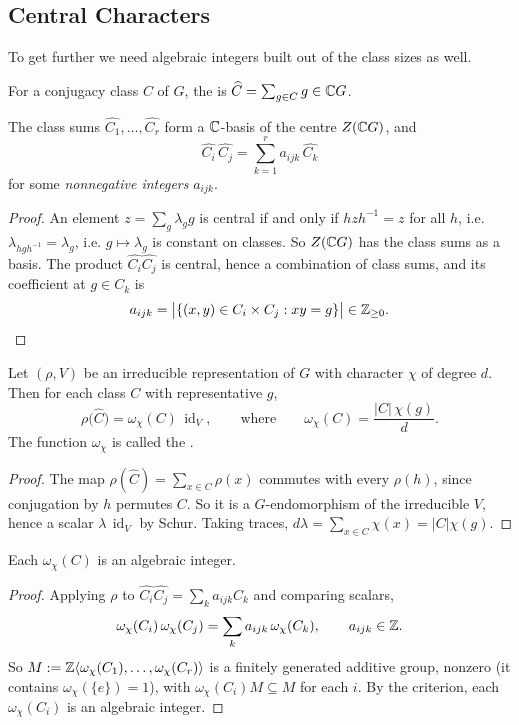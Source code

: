 \documentclass[a4paper]{scrartcl}
\newcommand{\id}{\operatorname{id}}
\newcommand{\gen}[1]{\langle #1 \rangle}
\begin{document}
\subsection{Central Characters}

To get further we need algebraic integers built out of the class sizes as well.

\begin{definition}
	For a conjugacy class $C$ of $G$, the  is $\widehat C = \sum_{g\in C}g \in \mathbb{C} G$.
\end{definition}

\begin{proposition}
	The class sums $\widehat{C_1},\dots,\widehat{C_r}$ form a $\mathbb{C}$-basis of the centre $Z(\mathbb{C} G)$, and
	$$\widehat{C_i}\,\widehat{C_j} = \sum_{k=1}^r a_{ijk}\,\widehat{C_k}$$
	for some \emph{nonnegative integers} $a_{ijk}$.
\end{proposition}
\begin{proof}
	An element $z = \sum_g\lambda_gg$ is central if and only if $hzh^{-1} = z$ for all $h$, i.e. $\lambda_{hgh^{-1}} = \lambda_g$, i.e. $g\mapsto\lambda_g$ is constant on classes. So $Z(\mathbb{C} G)$ has the class sums as a basis. The product $\widehat{C_i}\widehat{C_j}$ is central, hence a combination of class sums, and its coefficient at $g\in C_k$ is
	$$a_{ijk} = \big|\{(x,y)\in C_i\times C_j : xy = g\}\big| \in \mathbb{Z}_{\geq0}. \qedhere
	$$
\end{proof}

\begin{proposition}
	Let $(\rho,V)$ be an irreducible representation of $G$ with character $\chi$ of degree $d$. Then for each class $C$ with representative $g$,
	$$\rho\big(\widehat C\big) = \omega_\chi(C)\,\id_V, \qquad\text{where}\qquad \omega_\chi(C) = \frac{|C|\,\chi(g)}{d}.$$
	The function $\omega_\chi$ is called the .
\end{proposition}
\begin{proof}
	The map $\rho(\widehat C) = \sum_{x\in C}\rho(x)$ commutes with every $\rho(h)$, since conjugation by $h$ permutes $C$. So it is a $G$-endomorphism of the irreducible $V$, hence a scalar $\lambda\,\id_V$ by Schur. Taking traces, $d\lambda = \sum_{x\in C}\chi(x) = |C|\chi(g)$.
\end{proof}

\begin{proposition}
	Each $\omega_\chi(C)$ is an algebraic integer.
\end{proposition}
\begin{proof}
	Applying $\rho$ to $\widehat{C_i}\widehat{C_j} = \sum_ka_{ijk}\widehat{C_k}$ and comparing scalars,
	$$\omega_\chi(C_i)\,\omega_\chi(C_j) = \sum_{k}a_{ijk}\,\omega_\chi(C_k), \qquad a_{ijk}\in\mathbb{Z}.$$
	So $M := \Z\gen{\omega_\chi(C_1),\dots,\omega_\chi(C_r)}$ is a finitely generated additive group, nonzero (it contains $\omega_\chi(\{e\}) = 1$), with $\omega_\chi(C_i)M\subseteq M$ for each $i$. By the criterion, each $\omega_\chi(C_i)$ is an algebraic integer.
\end{proof}
\end{document}
